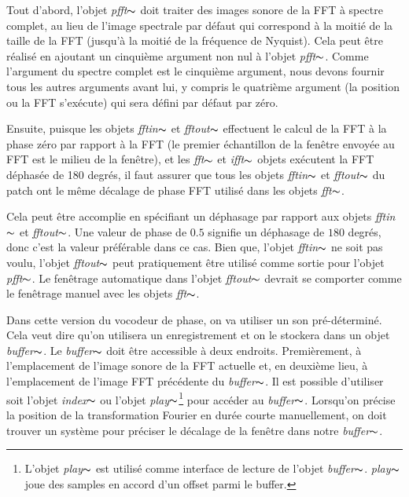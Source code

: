 Tout d'abord, l'objet \textit{pfft}$\thicksim$ doit traiter des images sonore de la FFT à spectre complet, au lieu de l'image spectrale par défaut qui correspond à la moitié de la taille de la FFT (jusqu'à la moitié de la fréquence de Nyquist). Cela peut être réalisé en ajoutant un cinquième argument non nul à l'objet \textit{pfft}$\thicksim$. Comme l'argument du spectre complet est le cinquième argument, nous devons fournir tous les autres arguments avant lui, y compris le quatrième argument (la position ou la FFT s’exécute) qui sera défini par défaut par zéro.

Ensuite, puisque les objets \textit{fftin}$\thicksim$ et \textit{fftout}$\thicksim$ effectuent le calcul de la FFT à la phase zéro par rapport à la FFT (le premier échantillon de la fenêtre envoyée au FFT est le milieu de la fenêtre), et les \textit{fft}$\thicksim$ et \textit{ifft}$\thicksim$ objets exécutent la FFT déphasée de 180 degrés, il faut assurer que tous les objets \textit{fftin}$\thicksim$ et \textit{fftout}$\thicksim$ du patch ont le même décalage de phase FFT utilisé dans les objets \textit{fft}$\thicksim$.

Cela peut être accomplie en spécifiant un déphasage par rapport aux objets \textit{fftin}$\thicksim$ et \textit{fftout}$\thicksim$. Une valeur de phase de $0.5$ signifie un déphasage de $180$ degrés, donc c'est la valeur préférable dans ce cas. Bien que, l'objet \textit{fftin}$\thicksim$ ne soit pas voulu, l'objet \textit{fftout}$\thicksim$ peut pratiquement être utilisé comme sortie pour l'objet \textit{pfft}$\thicksim$. Le fenêtrage automatique dans l'objet \textit{fftout}$\thicksim$ devrait se comporter comme le fenêtrage manuel avec les objets \textit{fft}$\thicksim$.

Dans cette version du vocodeur de phase, on va utiliser un son pré-déterminé. Cela veut dire qu'on utilisera un enregistrement et on le stockera dans un objet \textit{buffer}$\thicksim$. Le \textit{buffer}$\thicksim$ doit être accessible à deux endroits. Premièrement, à l'emplacement de l'image sonore de la FFT actuelle et, en deuxième lieu, à l'emplacement de l'image FFT précédente du \textit{buffer}$\thicksim$. Il est possible d'utiliser soit l'objet \textit{index}$\thicksim$ ou l'objet \textit{play}$\thicksim$\footnote{L'objet \textit{play}$\thicksim$ est utilisé comme interface de lecture de l'objet \textit{buffer}$\thicksim$. \textit{play}$\thicksim$ joue des samples en accord d'un offset parmi le buffer.} pour accéder au \textit{buffer}$\thicksim$. Lorsqu'on précise la position de la transformation Fourier en durée courte manuellement, on doit trouver un système pour préciser le décalage de la fenêtre dans notre \textit{buffer}$\thicksim$.

